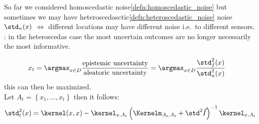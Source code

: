 \begin{sectionbox}\nospacing
  So far we considered homoscedastic noise\cref{defn:homoscedastic_noise} but
  sometimes we may have heteroscedasctic\cref{defn:heteroscedastic_noise} noise
  $\std_{n}(x)$ $\iff$ different locations may have different noise i.e.\ to different sensors.\\
  : in the heteroscedas case the most uncertain outcomes are no longer necessarily the most informative.
\end{sectionbox}
\begin{corbox}\nospacing
  \begin{cor}\label{cor:mutal_information_maximization_heteroscedastic_gaussian}
    \begin{align}
      x_{t}&=\argmax_{x\in D}\frac{\text{epistemic uncertainty}}{\text{aleatoric uncertainty}}
             =\argmax_{x\in D}\frac{\std_{f}^2(x)}{\std_n^2(x)}
    \end{align}
    this can then be maximized.\\
    Let $A_{t}=\left\{x_{1},\ldots,x_{t}\right\}$ then it follows:
    \begin{align}
      \std^2_t(x)=\kernel(x,x)-\kernel_{x,A_t}\left(\Kernelm_{A_t,A_t}+\std^2\vec{I}\right)^{-1}\kernel_{x,A_t}
    \end{align}
  \end{cor}
\end{corbox}
